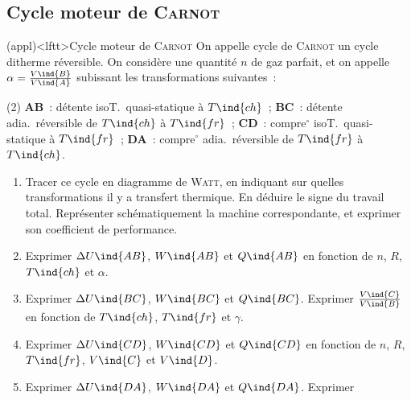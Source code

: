 \documentclass[../../main/main.tex]{subfiles}
\begin{document}
\subsection{Cycle moteur de \textsc{Carnot}}
\begin{tcb*}[breakable](appl)<lftt>{Cycle moteur de \textsc{Carnot}}
  On appelle cycle de \textsc{Carnot} un cycle ditherme réversible. On considère
  une quantité $n$ de gaz parfait, et on appelle $\alpha =
  \frac{V\ind{B}}{V\ind{A}}$ subissant les transformations suivantes~:
  \begin{tasks}[label=\bdmd](2)
    \task \textbf{AB}~: détente isoT.\ quasi-statique à $T\ind{ch}$~;
    \task \textbf{BC}~: détente adia.\ réversible de $T\ind{ch}$ à $T\ind{fr}$~;
    \task \textbf{CD}~: compre$^\circ$ isoT.\ quasi-statique à $T\ind{fr}$~;
    \task \textbf{DA}~: compre$^\circ$ adia.\ réversible de $T\ind{fr}$ à
      $T\ind{ch}$.
  \end{tasks}
  \begin{enumerate}[label=\sqenumi]
    \item Tracer ce cycle en diagramme de \textsc{Watt}, en indiquant sur
      quelles transformations il y a transfert thermique. En déduire le signe du
      travail total. Représenter schématiquement la machine correspondante, et
      exprimer son coefficient de performance.
    \item Exprimer $\Delta{U}\ind{AB}$, $W\ind{AB}$ et $Q\ind{AB}$ en fonction
      de $n$, $R$, $T\ind{ch}$ et $\alpha$.
    \item Exprimer $\Delta{U}\ind{BC}$, $W\ind{BC}$ et $Q\ind{BC}$. Exprimer
      $\frac{V\ind{C}}{V\ind{B}}$ en fonction de $T\ind{ch}$, $T\ind{fr}$ et
      $\gamma$.
    \item Exprimer $\Delta{U}\ind{CD}$, $W\ind{CD}$ et $Q\ind{CD}$ en fonction
      de $n$, $R$, $T\ind{fr}$, $V\ind{C}$ et $V\ind{D}$.
    \item Exprimer $\Delta{U}\ind{DA}$, $W\ind{DA}$ et $Q\ind{DA}$. Exprimer

\end{enumerate}
\end{tcb*}
\end{document}
